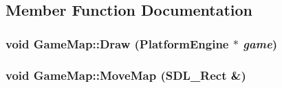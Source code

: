 \subsection{Member Function Documentation}
\hypertarget{class_game_map_c289ffedd32b98d2827e6b765b3e50d6}{
\subsubsection[{Draw}]{\setlength{\rightskip}{0pt plus 5cm}void GameMap::Draw ({\bf PlatformEngine} $\ast$ {\em game})}}
\label{d4/de2/class_game_map_c289ffedd32b98d2827e6b765b3e50d6}


\hypertarget{class_game_map_2be517853d4455e79a3c92c50e5f1722}{
\subsubsection[{MoveMap}]{\setlength{\rightskip}{0pt plus 5cm}void GameMap::MoveMap (SDL\_\-Rect \&)}}
\label{d4/de2/class_game_map_2be517853d4455e79a3c92c50e5f1722}


